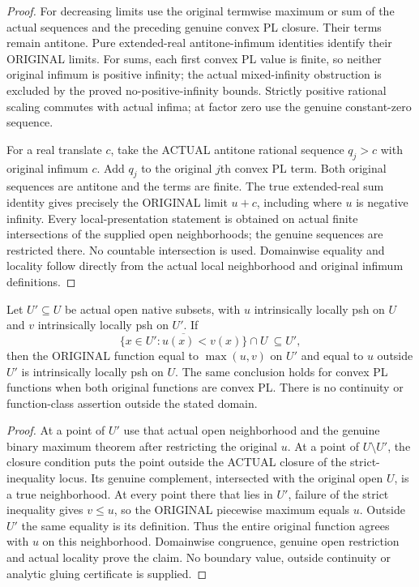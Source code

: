 \begin{proof}
For decreasing limits use the original termwise maximum or sum of the actual
sequences and the preceding genuine convex PL closure. Their terms remain
antitone. Pure extended-real antitone-infimum identities identify their
ORIGINAL limits. For sums, each first convex PL value is finite, so neither
original infimum is positive infinity; the actual mixed-infinity obstruction
is excluded by the proved no-positive-infinity bounds. Strictly positive
rational scaling commutes with actual infima; at factor zero use the genuine
constant-zero sequence.

For a real translate $c$, take the ACTUAL antitone rational sequence $q_j>c$
with original infimum $c$. Add $q_j$ to the original $j$th convex PL term.
Both original sequences are antitone and the terms are finite. The true
extended-real sum identity gives precisely the ORIGINAL limit $u+c$,
including where $u$ is negative infinity. Every local-presentation statement
is obtained on actual finite intersections of the supplied open neighborhoods;
the genuine sequences are restricted there. No countable intersection is
used. Domainwise equality and locality follow directly from the actual local
neighborhood and original infimum definitions.
\end{proof}

\begin{theorem}
\label{scheme:actual-native-local-psh-controlled-gluing}
\leanok
{}
Let $U'\subseteq U$ be actual open native subsets, with $u$ intrinsically locally
psh on $U$ and $v$ intrinsically locally psh on $U'$. If
\[
 \overline{\{x\in U':u(x)<v(x)\}}\cap U\ \subseteq U',
\]
then the ORIGINAL function equal to $\max(u,v)$ on $U'$ and equal to $u$ outside
$U'$ is intrinsically locally psh on $U$. The same conclusion holds for
convex PL functions when both original functions are convex PL.
There is no continuity or function-class assertion outside the stated domain.
\end{theorem}
\begin{proof}
At a point of $U'$ use that actual open neighborhood and the genuine binary
maximum theorem after restricting the original $u$. At a point of
$U\setminus U'$, the closure condition puts the point outside the ACTUAL
closure of the strict-inequality locus. Its genuine complement, intersected
with the original open $U$, is a true neighborhood. At every point there that
lies in $U'$, failure of the strict inequality gives $v\leq u$, so the ORIGINAL
piecewise maximum equals $u$. Outside $U'$ the same equality is its definition.
Thus the entire original function agrees with $u$ on this neighborhood.
Domainwise congruence, genuine open restriction and actual locality prove the
claim. No boundary value, outside continuity or analytic gluing certificate is
supplied.
\end{proof}
